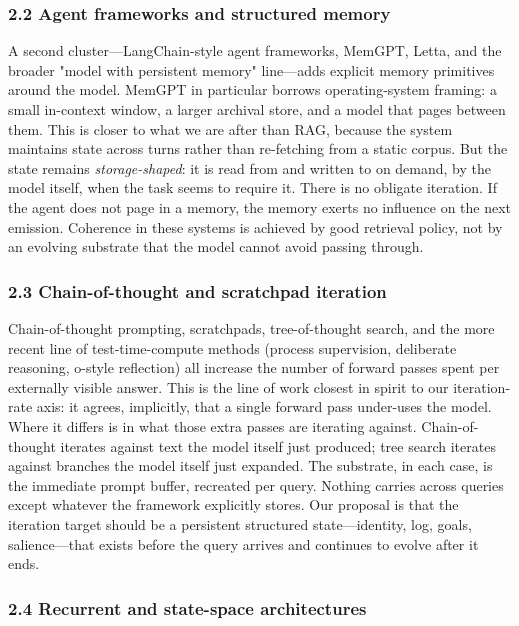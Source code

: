 \documentclass[11pt,letterpaper]{article}
\begin{document}
\subsubsection*{2.2 Agent frameworks and structured memory}

A second cluster---LangChain-style agent frameworks, MemGPT, Letta, and the broader "model with persistent memory" line---adds explicit memory primitives around the model. MemGPT in particular borrows operating-system framing: a small in-context window, a larger archival store, and a model that pages between them. This is closer to what we are after than RAG, because the system maintains state across turns rather than re-fetching from a static corpus. But the state remains \emph{storage-shaped}: it is read from and written to on demand, by the model itself, when the task seems to require it. There is no obligate iteration. If the agent does not page in a memory, the memory exerts no influence on the next emission. Coherence in these systems is achieved by good retrieval policy, not by an evolving substrate that the model cannot avoid passing through.

\subsubsection*{2.3 Chain-of-thought and scratchpad iteration}

Chain-of-thought prompting, scratchpads, tree-of-thought search, and the more recent line of test-time-compute methods (process supervision, deliberate reasoning, o-style reflection) all increase the number of forward passes spent per externally visible answer. This is the line of work closest in spirit to our iteration-rate axis: it agrees, implicitly, that a single forward pass under-uses the model. Where it differs is in what those extra passes are iterating against. Chain-of-thought iterates against text the model itself just produced; tree search iterates against branches the model itself just expanded. The substrate, in each case, is the immediate prompt buffer, recreated per query. Nothing carries across queries except whatever the framework explicitly stores. Our proposal is that the iteration target should be a persistent structured state---identity, log, goals, salience---that exists before the query arrives and continues to evolve after it ends.

\subsubsection*{2.4 Recurrent and state-space architectures}
\end{document}
